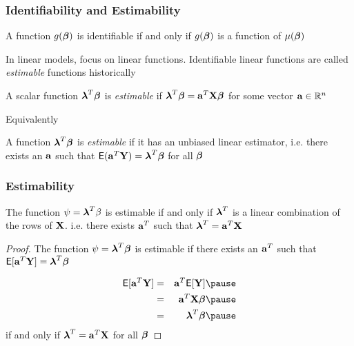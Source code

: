 \documentclass[handout]{beamer}\usepackage[]{graphicx}\usepackage[]{color}
\begin{document}
\begin{frame}
  \frametitle{Identifiability and Estimability}
  \begin{theorem}
    A function $g(\boldsymbol{\beta})$ is identifiable if and only if $g(\boldsymbol{\beta})$ is a
    function of $\mu(\boldsymbol{\beta})$
  \end{theorem} \pause
In linear models, focus on linear functions.  Identifiable linear
functions are called {\it estimable} functions historically \pause

\begin{definition}
  A scalar function $\boldsymbol{\lambda}^T \boldsymbol{\beta}$ is {\it estimable} if $\boldsymbol{\lambda}^T \boldsymbol{\beta}
  = \mathbf{a}^T \mathbf{X} \boldsymbol{\beta}$ for some vector $\mathbf{a} \in \mathbb{R}^n$ \pause
\end{definition}
Equivalently

\begin{definition}
  A  function $\boldsymbol{\lambda}^T \boldsymbol{\beta}$ is {\it estimable} if it has
  an unbiased linear estimator,   i.e. there exists an $\mathbf{a}$ such that
  $\textsf{E}(\mathbf{a}^T \mathbf{Y}) = \boldsymbol{\lambda}^T \boldsymbol{\beta}$ for all $\boldsymbol{\beta}$
\end{definition}

\end{frame}
\begin{frame}
  \frametitle{Estimability}
  \begin{theorem}
    The function $\psi = \boldsymbol{\lambda}^T \beta$ is estimable if and only if
    $\boldsymbol{\lambda}^T$ is a linear combination of the rows of
    $\mathbf{X}$. i.e. there exists $\mathbf{a}^T$ such that  $\boldsymbol{\lambda}^T = \mathbf{a}^T \mathbf{X}$
  \end{theorem} \pause
  \begin{proof}
   The function $\psi= \boldsymbol{\lambda}^T\boldsymbol{\beta}$ is estimable if there exists an $\mathbf{a}^T$ such that
    $\textsf{E}[\mathbf{a}^T\mathbf{Y}] = \boldsymbol{\lambda}^T\boldsymbol{\beta}$ \pause

    \begin{eqnarray*}
      \E[\a^T\Y] & =  &\a^T \E[\Y] \pause\\
                 & = & \a^T \X \b \pause \\
  & =& \lambdab^T \b  \pause
    \end{eqnarray*}
if and only if $\boldsymbol{\lambda}^T = \mathbf{a}^T \mathbf{X}$ for all $\boldsymbol{\beta}$
  \end{proof}
\end{frame}
\end{document}
